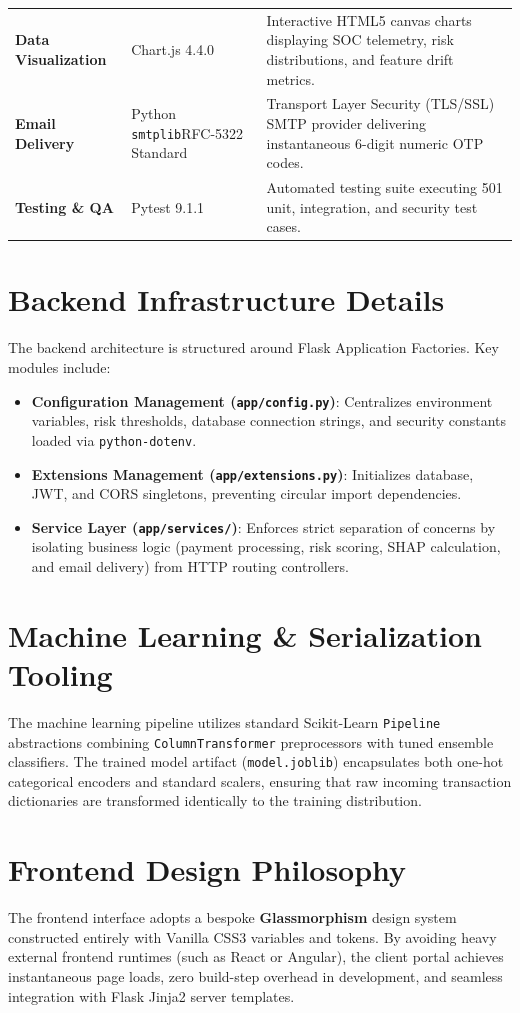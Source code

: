 \begin{table}[h]
\begin{tabularx}{\textwidth}{lp{3.5cm}X}
\addlinespace
\textbf{Data Visualization} & Chart.js 4.4.0 & Interactive HTML5 canvas charts displaying SOC telemetry, risk distributions, and feature drift metrics. \\
\addlinespace
\textbf{Email Delivery} & Python \texttt{smtplib}\newline RFC-5322 Standard & Transport Layer Security (TLS/SSL) SMTP provider delivering instantaneous 6-digit numeric OTP codes. \\
\addlinespace
\textbf{Testing \& QA} & Pytest 9.1.1 & Automated testing suite executing 501 unit, integration, and security test cases. \\
\bottomrule
\end{tabularx}
\end{table}

\section{Backend Infrastructure Details}
The backend architecture is structured around Flask Application Factories. Key modules include:
\begin{itemize}
    \item \textbf{Configuration Management (\texttt{app/config.py})}: Centralizes environment variables, risk thresholds, database connection strings, and security constants loaded via \texttt{python-dotenv}.
    \item \textbf{Extensions Management (\texttt{app/extensions.py})}: Initializes database, JWT, and CORS singletons, preventing circular import dependencies.
    \item \textbf{Service Layer (\texttt{app/services/})}: Enforces strict separation of concerns by isolating business logic (payment processing, risk scoring, SHAP calculation, and email delivery) from HTTP routing controllers.
\end{itemize}

\section{Machine Learning \& Serialization Tooling}
The machine learning pipeline utilizes standard Scikit-Learn \texttt{Pipeline} abstractions combining \texttt{ColumnTransformer} preprocessors with tuned ensemble classifiers. The trained model artifact (\texttt{model.joblib}) encapsulates both one-hot categorical encoders and standard scalers, ensuring that raw incoming transaction dictionaries are transformed identically to the training distribution.

\section{Frontend Design Philosophy}
The frontend interface adopts a bespoke \textbf{Glassmorphism} design system constructed entirely with Vanilla CSS3 variables and tokens. By avoiding heavy external frontend runtimes (such as React or Angular), the client portal achieves instantaneous page loads, zero build-step overhead in development, and seamless integration with Flask Jinja2 server templates.
